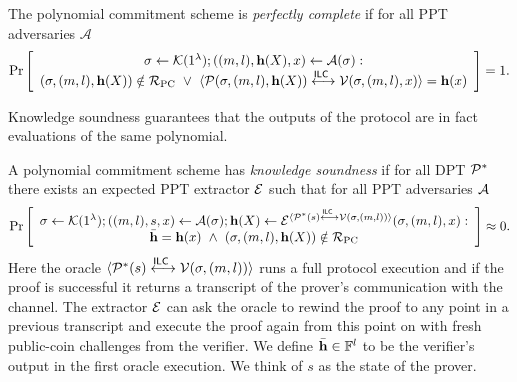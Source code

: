\begin{definition}
The polynomial commitment scheme is \emph{perfectly complete} if for all PPT adversaries $\mathcal{A}$
$$\Pr \left[ \begin{array}{c} \mathsf{\sigma}\gets \mathcal{K}(1^{\lambda}); ((m,l),\mathbf{h}(X),x) \leftarrow \mathcal{A}(\mathsf{\sigma}): \\
(\mathsf{\sigma},(m,l),\mathbf{h}(X))\notin \mathcal{R}_\mathrm{PC} ~\vee~ \langle \mathcal{P}(\mathsf{\sigma},(m,l),\mathbf{h}(X))\overset{\mathsf{ILC}~}{\longleftrightarrow}\mathcal{V}(\mathsf{\sigma},(m,l),x)\rangle= \mathbf{h}(x) \end{array}\right] =1.$$
\end{definition}

Knowledge soundness guarantees that the outputs of the protocol are in fact evaluations of the same polynomial.

\begin{definition}
A polynomial commitment scheme has \emph{knowledge soundness} if for all DPT $\mathcal{P}^*$ there exists an expected PPT extractor $\mathcal{E}$ such that for all PPT adversaries $\mathcal{A}$
$$\Pr\left[\begin{array}{c} \mathsf{\sigma}\gets \mathcal{K}(1^{\lambda});((m,l),s,x) \gets \mathcal{A}(\mathsf{\sigma}); \mathbf{h}(X) \gets \mathcal{E}^{\langle \mathcal{P}^*(s)\overset{\mathsf{ILC}~}{\longleftrightarrow}\mathcal{V}(\mathsf{\sigma},(m,l))\rangle}(\mathsf{\sigma},(m,l),x):\\ \bar{\mathbf{h}} = \mathbf{h}(x) ~\wedge~ (\mathsf{\sigma},(m,l),\mathbf{h}(X))\notin \mathcal{R}_\mathrm{PC} \end{array}\right]\approx 0.$$ 
Here the oracle $\langle \mathcal{P}^*(s)\overset{\mathsf{ILC}~}{\longleftrightarrow}\mathcal{V}(\mathsf{\sigma},(m,l))\rangle$ runs a full protocol execution and if the proof is successful it returns a transcript of the prover's communication with the channel. The extractor $\mathcal{E}$ can ask the oracle to rewind the proof to any point in a previous transcript and execute the proof again from this point on with fresh public-coin challenges from the verifier. We define $\bar{\mathbf{h}} \in \mathbb{F}^l$ to be the verifier's output in the first oracle execution. We think of $s$ as the state of the prover.
\end{definition}

